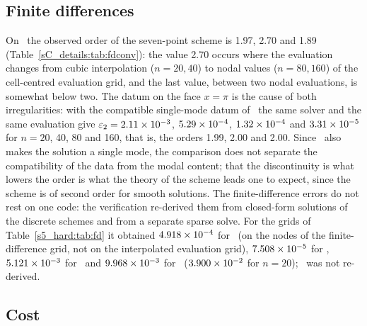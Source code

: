 \subsection{Finite differences}\label{S4:sec:fd}

On \PLthree\ the observed order of the seven-point scheme is 1.97, 2.70 and 1.89
(Table~\ref{sC_details:tab:fdconv}): the value 2.70 occurs where the evaluation changes from
cubic interpolation ($n=20,40$) to nodal values ($n=80,160$) of the cell-centred evaluation
grid, and the last value, between two nodal evaluations, is somewhat below two. The datum on
the face $x=\pi$ is the cause of both irregularities: with the compatible single-mode datum
of \PLthreeS\ the same solver and the same evaluation give $\varepsilon_{2}=2.11\times 10^{-3}$,
$5.29\times 10^{-4}$, $1.32\times 10^{-4}$ and $3.31\times 10^{-5}$ for $n=20$, 40, 80 and 160, that is,
the orders 1.99, 2.00 and 2.00. Since \PLthreeS\ also makes the solution a single mode, the
comparison does not separate the compatibility of the data from the modal content; that the
discontinuity is what lowers the order is what the theory of the scheme leads one to expect,
since the scheme is of second order for smooth solutions.
The finite-difference errors do not rest on one code: the verification re-derived them from
closed-form solutions of the discrete schemes and from a separate sparse solve. For the grids
of Table~\ref{s5_hard:tab:fd} it obtained $4.918\times 10^{-4}$ for \PH\ (on the nodes of the
finite-difference grid, not on the interpolated evaluation grid), $7.508\times 10^{-5}$ for
\PLtwo, $5.121\times 10^{-3}$ for \PWtwo\ and $9.968\times 10^{-3}$ for \PLthree\ ($3.900\times 10^{-2}$
for $n=20$); \PWone\ was not re-derived.

\subsection{Cost}\label{S4:sec:cost}

